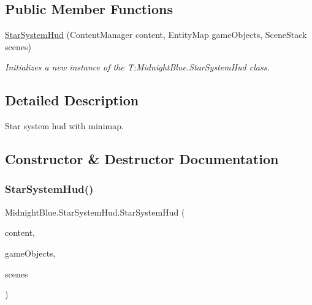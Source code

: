 \subsection*{Public Member Functions}
\begin{DoxyCompactItemize}
\item 
\hyperlink{class_midnight_blue_1_1_star_system_hud_acfe0b74ff1b0013956511de5ab3d38b3}{Star\+System\+Hud} (Content\+Manager content, Entity\+Map game\+Objects, Scene\+Stack scenes)
\begin{DoxyCompactList}\small\item\em Initializes a new instance of the T\+:\+Midnight\+Blue.\+Star\+System\+Hud class. \end{DoxyCompactList}\end{DoxyCompactItemize}


\subsection{Detailed Description}
Star system hud with minimap. 



\subsection{Constructor \& Destructor Documentation}
\hypertarget{class_midnight_blue_1_1_star_system_hud_acfe0b74ff1b0013956511de5ab3d38b3}{}\label{class_midnight_blue_1_1_star_system_hud_acfe0b74ff1b0013956511de5ab3d38b3} 
\subsubsection{\texorpdfstring{Star\+System\+Hud()}{StarSystemHud()}}
{\footnotesize\ttfamily Midnight\+Blue.\+Star\+System\+Hud.\+Star\+System\+Hud (\begin{DoxyParamCaption}\item[{Content\+Manager}]{content,  }\item[{Entity\+Map}]{game\+Objects,  }\item[{Scene\+Stack}]{scenes }\end{DoxyParamCaption})\hspace{0.3cm}{\ttfamily [inline]}}



